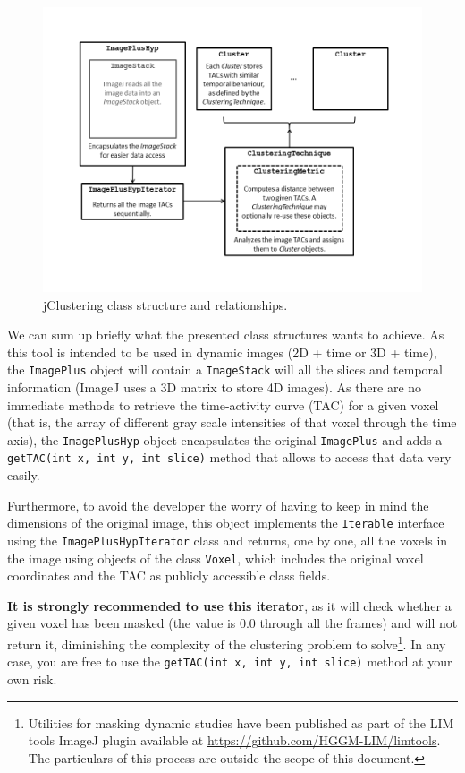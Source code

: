 \documentclass[11pt]{article} %
\begin{document}
\begin{figure}[htbp]
  \centering
    \includegraphics[width=\textwidth]{figures/class_structure}
  \caption{jClustering class structure and relationships.}
  \label{fig:class_structure}
\end{figure}

We can sum up briefly what the presented class structures wants to achieve. As this tool is intended to be used in dynamic images (2D + time or 3D + time), the {\tt ImagePlus} object will contain a {\tt ImageStack} will all the slices and temporal information (ImageJ uses a 3D matrix to store 4D images). As there are no immediate methods to retrieve the time-activity curve (TAC) for a given voxel (that is, the array of different gray scale intensities of that voxel through the time axis), the {\tt ImagePlusHyp} object encapsulates the original {\tt ImagePlus} and adds a {\tt getTAC(int x, int y, int slice)} method that allows to access that data very easily. 

Furthermore, to avoid the developer the worry of having to keep in mind the dimensions of the original image, this object implements the {\tt Iterable} interface using the {\tt ImagePlusHypIterator} class and returns, one by one, all the voxels in the
image using objects of the class {\tt Voxel}, which includes the original voxel coordinates and the TAC as publicly accessible class fields. 

{\bf It is strongly recommended to use this iterator}, as it will check whether a given voxel has been masked (the value is 0.0 through all the frames) and will not return it, diminishing the complexity of the clustering problem to solve\footnote{Utilities for masking dynamic studies have been published as part of the LIM tools ImageJ plugin available at \url{https://github.com/HGGM-LIM/limtools}. The particulars of this process are outside the scope of this document.}. In any case, you are free to use the {\tt getTAC(int x, int y, int slice)} method at your own risk.
\end{document}
